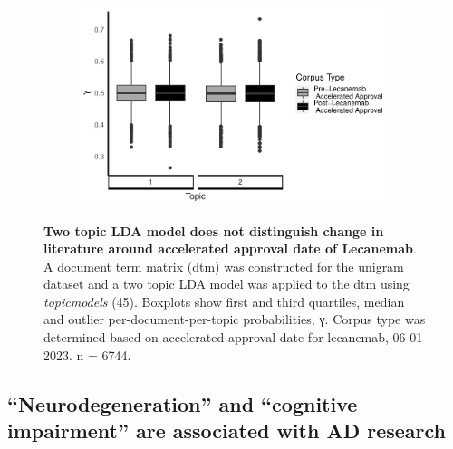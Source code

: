 \documentclass[
  a4paper,
]{article}
\begin{document}
\begin{figure}

{\centering 

\begin{figure}[H]

{\centering \includegraphics{report_pdf_files/figure-pdf/fig-gamma-lda-1.pdf}

}

\end{figure}

}

\caption{\label{fig-gamma-lda}\textbf{Two topic LDA model does not
distinguish change in literature around accelerated approval date of
Lecanemab}. A document term matrix (dtm) was constructed for the unigram
dataset and a two topic LDA model was applied to the dtm using
\emph{topicmodels} (45). Boxplots show first and third quartiles, median
and outlier per-document-per-topic probabilities, γ. Corpus type was
determined based on accelerated approval date for lecanemab, 06-01-2023.
n = 6744.}

\end{figure}

\hypertarget{neurodegeneration-and-cognitive-impairment-are-associated-with-ad-research}{%
\subsection{``Neurodegeneration'' and ``cognitive impairment'' are
associated with AD
research}\label{neurodegeneration-and-cognitive-impairment-are-associated-with-ad-research}}
\end{document}
